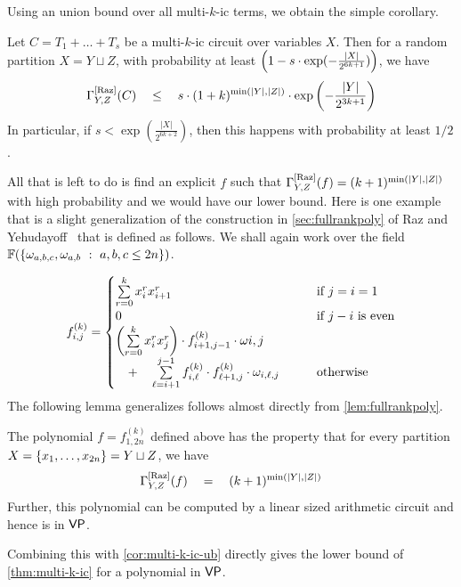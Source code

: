 \noindent
Using an union bound over all multi-$k$-ic terms, we obtain the simple corollary. 

\begin{corollary}\label{cor:multi-k-ic-ub}
Let $C = T_1 + \dots + T_s$ be a multi-$k$-ic circuit over variables $X$. 
Then for a random partition $X = Y \sqcup Z$, with probability at least $\left(1 - s  \cdot \exp(-\frac{|X|}{2^{6k+1}})\right)$, we have
\[
\Gamma^{\mathrm{[Raz]}}_{Y,Z}(C) \quad \leq \quad s \cdot (1+k)^{\min(|Y|,|Z|)}\cdot \exp\left(-\frac{|Y|}{2^{3k+1}}\right)
\]
In particular, if $s < \exp(\frac{|X|}{2^{6k+2}})$, then this happens with probability at least $1/2$. 
\end{corollary}

All that is left to do is find an explicit $f$ such that $\Gamma^{\mathrm{[Raz]}}_{Y,Z}(f) = (k+1)^{\min(|Y|,|Z|)}$ with high probability and we would have our lower bound. 
Here is one example that is a slight generalization of the construction in \autoref{sec:fullrankpoly}  of Raz and Yehudayoff~\cite{ry08} that is defined as follows. 
We shall again work over the field $\mathbb{F}(\left\{{\omega_{a,b,c},\omega_{a,b}}\ : \ {a,b,c\leq 2n}\right\})$. 

\[
f_{i,j}^{(k)} =  \begin{cases}
 \sum\limits_{r=0}^k x_i^r x_{i+1}^r & \text{if $j = i=1$}\\
 0  & \text{if $j -i$ is even}\\
 \left(\sum\limits_{r=0}^k x_i^r x_{j}^r\right) \cdot f_{i+1,j-1}^{(k)} \cdot \omega{i,j}& \\
 \quad + \quad \sum\limits_{\ell=i+1}^{j-1} f_{i,\ell}^{(k)} \cdot f_{\ell+1,j}^{(k)} \cdot \omega_{i,\ell,j}\quad\quad & \text{otherwise} 
\end{cases}
\]
\noindent
The following lemma generalizes follows almost directly from \autoref{lem:fullrankpoly}. 

\begin{lemma}
The polynomial $f = f_{1,2n}^{(k)}$ defined above has the property that for every partition $X = \left\{x_1,\dots, x_{2n}\right\} = Y \sqcup Z$, we have
\[
\Gamma^{\mathrm{[Raz]}}_{Y,Z}(f) \quad = \quad (k+1)^{\min(|Y|,|Z|)}
\]
Further, this polynomial can be computed by a linear sized arithmetic circuit and hence is in $\mathsf{VP}$. 
\end{lemma}

Combining this with \autoref{cor:multi-k-ic-ub} directly gives the lower bound of \autoref{thm:multi-k-ic} for a polynomial in $\mathsf{VP}$. 

